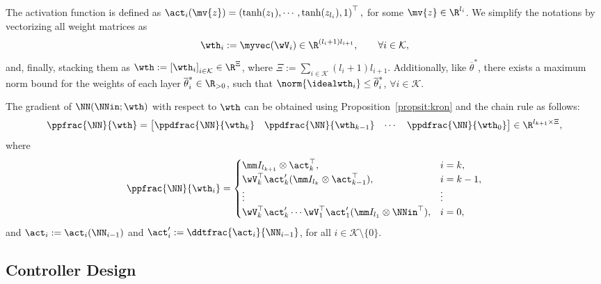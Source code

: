 \documentclass[letterpaper, journal, twoside]{IEEEtran}
\begin{document}
The activation function is defined as $\act_i(\mv{z}) = \left(\tanh(z_1),\cdots,\tanh(z_{l_i}),1\right)^\top,$ for some $\mv{z}\in\R^{l_i}$.
We simplify the notations by vectorizing all weight matrices as 
\begin{equation*}
  \wth_i 
  :=
  \myvec(\wV_i)
  \in\R^{(l_i+1)l_{i+1}}
  ,
  \qquad
  \forall 
  i\in\mathcal{K}
  ,
\end{equation*}
and, finally, stacking them as $\wth := \left[\wth_i\right]_{i\in\mathcal{K}}\in\R^\Xi$, where $\Xi := \sum_{i\in\mathcal{K}} (l_i+1)l_{i+1}$.
Additionally, like $\overline{\theta}^*$, there exists a maximum norm bound for the weights of each layer $\overline{\theta}^*_i\in\R_{>0}$, such that $\norm{\idealwth_i}\le\overline{\theta}^*_i$, $\forall i\in\mathcal{K}$.

The gradient of $ \NN(\NNin;\wth)$ with respect to $\wth$ can be obtained using Proposition~\ref{propsit:kron} and the chain rule as follows:
\begin{equation}
  \ppfrac{\NN}{\wth}=
  \begin{bmatrix}
    \ppdfrac{\NN}{\wth_k}&
    \ppdfrac{\NN}{\wth_{k-1}}&
\cdots &
    \ppdfrac{\NN}{\wth_0}
  \end{bmatrix}
  \in\R^{l_{k+1} \times \Xi}
  ,
  \label{eq:gradient:phi}
\end{equation}
where
\begin{equation}
  \ppfrac{\NN}{\wth_i} = 
  \begin{cases}
      \mm I_{l_{k+1}}
      \otimes 
      \act_{k}^\top  
    , 
    &
    i=k
    ,
    \\
    \wV_k^\top\act_{k}' 
    (
      \mm I_{l_{k}}
      \otimes  
      \act_{k-1}^\top  
    )
    , 
    & 
    i=k-1
    ,
    \\
    \vdots 
    &
    \vdots 
    \\
    \wV_k^\top\act'_{k} 
    \cdots 
    \wV_1^\top\act_1' 
    (
      \mm I_{l_1}
      \otimes 
      \NNin^\top  
    )
    , 
    &
    i = 0
    ,
  \end{cases}
  \label{eq:NN:grad}
\end{equation}
and $\act_i:= \act_i(\NN_{i-1})$ and $\act_i':= \ddtfrac{\act_i}{\NN_{i-1}}$, for all $i\in\mathcal{K}\setminus\{0\}$.

\subsection{Controller Design} \label{sec:main:result:sub:ctrl:design}
\end{document}
